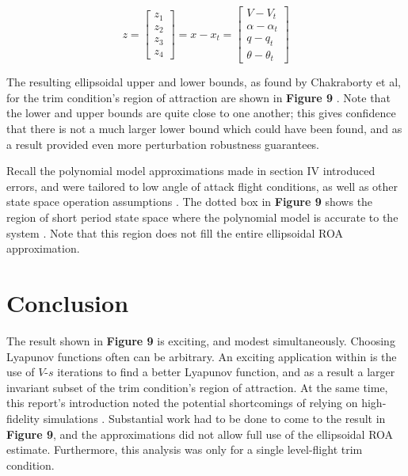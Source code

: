 \documentclass[%
 reprint,
 amsmath,amssymb,
 aps,
]{revtex4-2}
\begin{document}
\begin{equation*}
    z = \begin{bmatrix}
    z_1 \\ z_2 \\ z_3 \\ z_4 
    \end{bmatrix} = x - x_t = \begin{bmatrix}
    V-V_t \\ \alpha - \alpha_t \\ q - q_t \\ \theta - \theta_t
    \end{bmatrix}
\end{equation*}
    
The resulting ellipsoidal upper and lower bounds, as found by Chakraborty et al, for the trim condition's region of attraction are shown in \textbf{Figure 9} \cite{primary}. Note that the lower and upper bounds are quite close to one another; this gives confidence that there is not a much larger lower bound which could have been found, and as a result provided even more perturbation robustness guarantees. 

Recall the polynomial model approximations made in section IV introduced errors, and were tailored to low angle of attack flight conditions, as well as other state space operation assumptions \cite{primary}. The dotted box in \textbf{Figure 9} shows the region of short period state space where the polynomial model is accurate to the system \cite{primary}. Note that this region does not fill the entire ellipsoidal ROA approximation. 
\section{Conclusion}

The result shown in \textbf{Figure 9} is exciting, and modest simultaneously. Choosing Lyapunov functions often can be arbitrary. An exciting application within \cite{primary} is the use of $V$-$s$ iterations to find a better Lyapunov function, and as a result a larger invariant subset of the trim condition's region of attraction. At the same time, this report's introduction noted the potential shortcomings of relying on high-fidelity simulations \cite{primary}\cite{leaf}. Substantial work had to be done to come to the result in \textbf{Figure 9}, and the approximations did not allow full use of the ellipsoidal ROA estimate. Furthermore, this analysis was only for a single level-flight trim condition. 
\end{document}
